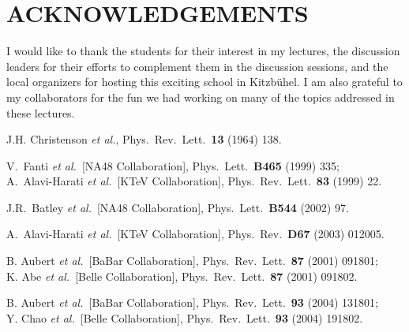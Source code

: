 \documentclass[11pt]{cernrep}
\begin{document}
\vskip1cm
\noindent

\section*{ACKNOWLEDGEMENTS}

I would like to thank the students for their interest in my lectures,
the discussion leaders for their efforts to complement them in the
discussion sessions, and the local organizers for hosting this exciting
school in Kitzb\"uhel. I am also grateful to my collaborators for the fun 
we had working on many of the topics addressed in these lectures.



\begin{thebibliography}{999}


J.H. Christenson {\it et al.}, 
{Phys.\ Rev.\ Lett.}~{\bf 13} (1964) 138.

V.~Fanti {\it et al.}\  [NA48 Collaboration],
{ Phys.\ Lett.}~{\bf B465} (1999) 335;\\
A.~Alavi-Harati {\it et al.}\  [KTeV Collaboration],
{ Phys.\ Rev.\ Lett.}~{\bf 83} (1999) 22.

J.R.~Batley {\it et al.}\  [NA48 Collaboration],
{ Phys.\ Lett.}~{\bf B544} (2002) 97.

A.~Alavi-Harati {\it et al.}\  [KTeV Collaboration],
{ Phys.\ Rev.}~{\bf D67} (2003) 012005.

B. Aubert {\it et al.}\ [BaBar Collaboration],
{ Phys.\ Rev.\ Lett.}~{\bf 87} (2001) 091801;\\
K. Abe {\it et al.}\ [Belle Collaboration],
{ Phys.\ Rev.\ Lett.}~{\bf 87} (2001) 091802.

B. Aubert {\it et al.}\ [BaBar Collaboration],
  { Phys.\ Rev.\ Lett.}~{\bf 93} (2004) 131801;\\
  Y. Chao {\it et al.}\  [Belle Collaboration],
  { Phys.\ Rev.\ Lett.}~{\bf 93} (2004) 191802.


\end{thebibliography}
\end{document}
